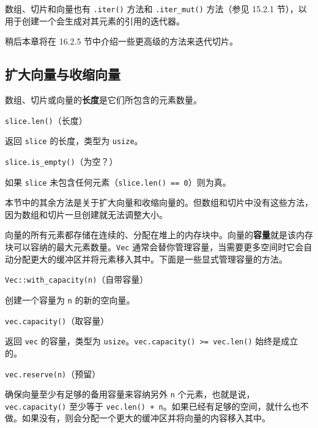 数组、切片和向量也有 \texttt{.iter()} 方法和 \texttt{.iter\_mut()} 方法（参见 15.2.1 节），以用于创建一个会生成对其元素的引用的迭代器。

稍后本章将在 16.2.5 节中介绍一些更高级的方法来迭代切片。

\subsection{扩大向量与收缩向量}

数组、切片或向量的\textbf{长度}是它们所包含的元素数量。

\begin{mySidenote}
\texttt{slice.len()}（长度）
\end{mySidenote}

返回 \texttt{slice} 的长度，类型为 \texttt{usize}。

\begin{mySidenote}
\texttt{slice.is\_empty()}（为空？）
\end{mySidenote}

如果 \texttt{slice} 未包含任何元素（\texttt{slice.len() == 0}）则为真。

本节中的其余方法是关于扩大向量和收缩向量的。但数组和切片中没有这些方法，因为数组和切片一旦创建就无法调整大小。

向量的所有元素都存储在连续的、分配在堆上的内存块中。向量的\textbf{容量}就是该内存块可以容纳的最大元素数量。\texttt{Vec} 通常会替你管理容量，当需要更多空间时它会自动分配更大的缓冲区并将元素移入其中。下面是一些显式管理容量的方法。

\begin{mySidenote}
\texttt{Vec::with\_capacity(n)}（自带容量）
\end{mySidenote}

创建一个容量为 \texttt{n} 的新的空向量。

\begin{mySidenote}
\texttt{vec.capacity()}（取容量）
\end{mySidenote}

返回 \texttt{vec} 的容量，类型为 \texttt{usize}。\texttt{vec.capacity() >= vec.len()} 始终是成立的。

\begin{mySidenote}
\texttt{vec.reserve(n)}（预留）
\end{mySidenote}

确保向量至少有足够的备用容量来容纳另外 \texttt{n} 个元素，也就是说，\texttt{vec.capacity()} 至少等于 \texttt{vec.len() + n}。如果已经有足够的空间，就什么也不做。如果没有，则会分配一个更大的缓冲区并将向量的内容移入其中。

